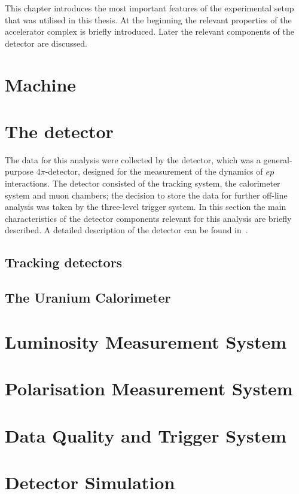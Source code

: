 This chapter introduces the most important features of the  experimental setup that was utilised in this thesis. At the beginning the relevant properties of the accelerator complex is briefly introduced. Later the relevant components of the \zeus detector are discussed.

\section{\hera Machine}
\label{sec:hera}


\section{The \zeus detector}
\label{subsec:zeusdet}
The data for this analysis were collected by the \zeus detector, which was a general-purpose $4\pi$-detector, designed for the measurement of the dynamics of $\mbox{$e p$}$ interactions. The \zeus detector consisted of the tracking system, the calorimeter system and muon chambers; the decision to store the data for further off-line analysis was taken by the three-level trigger system. In this section the main characteristics of the detector components relevant for this analysis are briefly described. A detailed description of the detector can be found in~\cite{zeus:1993:bluebook}.


\subsection{Tracking detectors}
\label{subsec:trackdet}


\subsection{The Uranium Calorimeter}
\label{subsec:UCAL}


\section{Luminosity Measurement System}
\label{sec:lumimeas}


\section{Polarisation Measurement System}
\label{sec:polarmeas}


\section{Data Quality and Trigger System}
\label{sec:daqtrigger}


\section{Detector Simulation}
\label{sec:detsim}

